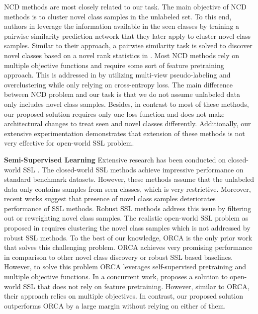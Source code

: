 \documentclass[runningheads]{eccv2022submission}
\begin{document}
NCD methods are most closely related to our task. The main objective of NCD methods is to cluster novel class samples in the unlabeled set. To this end, authors in \cite{hsu2018learning} leverage the information available in the seen classes by training a pairwise similarity prediction network that they later apply to cluster novel class samples. Similar to their approach, a pairwise similarity task is solved  to discover novel classes based on a novel rank statistics in \cite{Han2020Automatically}. Most NCD methods rely on multiple objective functions and require some sort of feature pretraining approach. This is addressed in \cite{fini2021unified}  by utilizing multi-view pseudo-labeling and overclustering while only relying on cross-entropy loss. The main difference between NCD problem and our task is that we do not assume unlabeled data only includes novel class samples. Besides, in contrast to most of these methods, our proposed solution requires only one loss function and does not make architectural changes to treat seen and novel classes differently. Additionally, our extensive experimentation demonstrates that extension of these methods is not very effective for open-world SSL problem.  


\vspace{1mm}
\noindent\textbf{Semi-Supervised Learning } 
Extensive research has been conducted on closed-world SSL \cite{Gammerman1998Learning,joachims1999transductive,liu2019deep,kingma2014semi,pu2016variational,chen2020big,caron2020unsupervised,NIPS2016_6333,LaineA17,Miyato2018VirtualAT,NIPS2017_6719_meanT,Lee2013PseudoLabelT,Shi_2018_ECCV,NIPS2019_8749_MixMatch,Berthelot2020ReMixMatch:,sohn2020fixmatch}. The closed-world SSL methods achieve impressive performance on standard benchmark datasets. However, these methods assume that the unlabeled data only contains samples from seen classes, which is very restrictive. Moreover, recent works \cite{oliver2018realistic,chen2020semi} suggest that presence of novel class samples deteriorates performance of SSL methods. Robust SSL methods \cite{guo2020safe,chen2020semi,zhao2020robust} address this issue by filtering out or reweighting novel class samples. The realistic open-world SSL problem as proposed in \cite{cao2022openworld} requires clustering the novel class samples which is not addressed by robust SSL methods. To the best of our knowledge, ORCA \cite{cao2022openworld} is the only prior work that solves this challenging problem. ORCA achieves very promising performance in comparison to other novel class discovery or robust SSL based baselines. However, to solve this problem ORCA leverages self-supervised pretraining and multiple objective functions. In a concurrent work, \cite{rizve2022openldn} proposes a solution to open-world SSL that does not rely on feature pretraining. However, similar to ORCA, their approach relies on multiple objectives. In contrast, our proposed solution outperforms ORCA by a large margin without relying on either of them.
\end{document}
